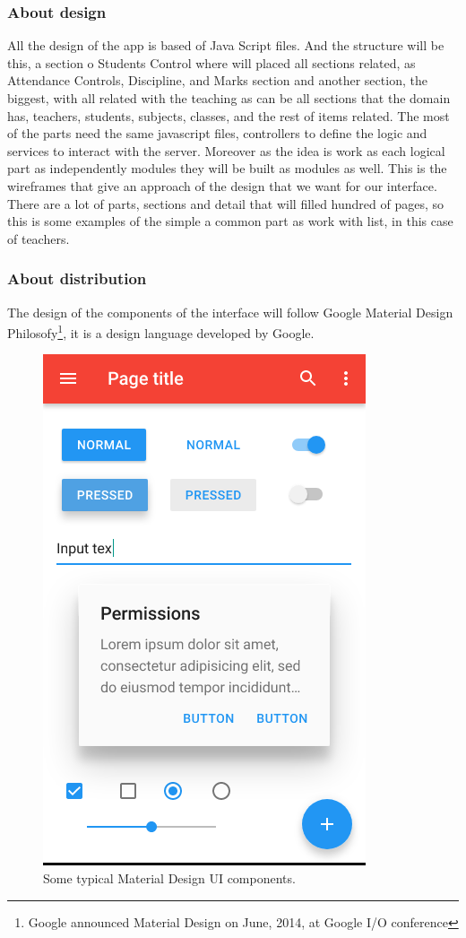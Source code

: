 \subsubsection{About design}

All the design of the app is based of Java Script files. And the structure will
be this,  a section o Students Control where will placed all sections related,
as Attendance Controls, Discipline, and Marks section and another section, the
biggest, with all related with the teaching as can be all sections that the domain
has, teachers, students, subjects, classes, and the rest of items related.
\intro
The most of the parts need the same javascript files, controllers to define the
logic and services to interact with the server. Moreover as the idea is work as
each logical part as independently modules they will be built as modules as well.
\intro
This is the wireframes that give an approach of the design that we want for
our interface. There are a lot of parts, sections and detail that will
filled hundred of pages, so this is some examples of the simple a common
part as work with list, in this case of teachers.

\subsubsection{About distribution}

The design of the components of the interface will follow
Google Material Design Philosofy\footnote{Google announced Material Design on
June, 2014, at Google I/O conference}, it is a design language developed by
Google.

\begin{figure}[H]
  \includegraphics[scale=0.4]{img/graphics/MaterialDesign.png}
  \centering
  \caption{Some typical Material Design UI components.}
\end{figure}

